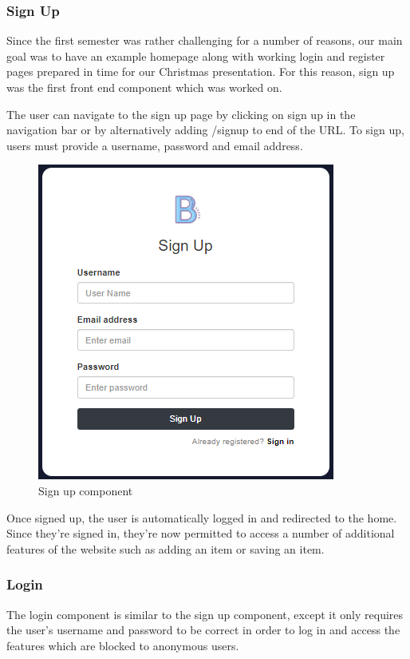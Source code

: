 \subsubsection{Sign Up}
Since the first semester was rather challenging for a number of reasons, our main goal was to have an example homepage along with working login and register pages prepared in time for our Christmas presentation. For this reason, sign up was the first front end component which was worked on. \par
The user can navigate to the sign up page by clicking on sign up in the navigation bar or by alternatively adding /signup to end of the URL. To sign up, users must provide a username, password and email address. 
\begin{figure}[ht]
\renewcommand\thefigure{4.2}
\centering
\includegraphics[scale=1]{img/fe_signup.png}
\caption{Sign up component}
\label{SignUp}
\end{figure}

Once signed up, the user is automatically logged in and redirected to the home. Since they're signed in, they're now permitted to access a number of additional features of the website such as adding an item or saving an item.  

\subsubsection{Login}
The login component is similar to the sign up component, except it only requires the user's username and password to be correct in order to log in and access the features which are blocked to anonymous users. 

